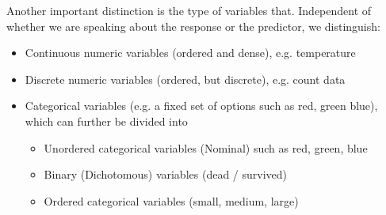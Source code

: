 \documentclass[a4paper,twoside]{tufte-book} %
\begin{document}
Another important distinction is the type of variables that. Independent of whether we are speaking about the response or the predictor, we distinguish: 

\begin{itemize}
\item Continuous numeric variables (ordered and dense), e.g. temperature
\item Discrete numeric variables (ordered, but discrete), e.g. count data
\item Categorical variables (e.g. a fixed set of options such as red, green blue), which can further be divided into
\begin{itemize}
\item Unordered categorical variables (Nominal) such as red, green, blue 
\item Binary (Dichotomous) variables (dead / survived)
\item Ordered categorical variables (small, medium, large)
\end{itemize}
\end{itemize}
\end{document}
